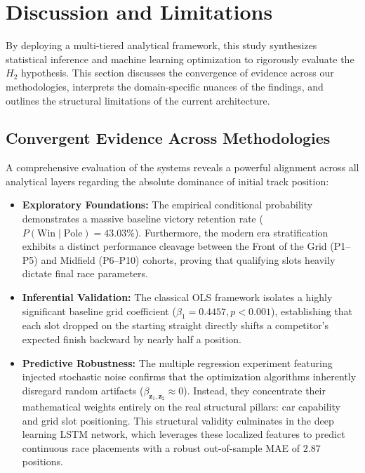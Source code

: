 \section{Discussion and Limitations}
\label{sec:discussion}

By deploying a multi-tiered analytical framework, this study synthesizes statistical inference and machine learning optimization to rigorously evaluate the $H_2$ hypothesis. This section discusses the convergence of evidence across our methodologies, interprets the domain-specific nuances of the findings, and outlines the structural limitations of the current architecture.

\subsection{Convergent Evidence Across Methodologies}
\label{subsec:convergent_evidence}

A comprehensive evaluation of the systems reveals a powerful alignment across all analytical layers regarding the absolute dominance of initial track position:
\begin{itemize}
    \item \textbf{Exploratory Foundations:} The empirical conditional probability demonstrates a massive baseline victory retention rate ($P(\text{Win} \mid \text{Pole}) = 43.03\%$). Furthermore, the modern era stratification exhibits a distinct performance cleavage between the Front of the Grid (P1--P5) and Midfield (P6--P10) cohorts, proving that qualifying slots heavily dictate final race parameters.
    \item \textbf{Inferential Validation:} The classical OLS framework isolates a highly significant baseline grid coefficient ($\beta_1 = 0.4457, p < 0.001$), establishing that each slot dropped on the starting straight directly shifts a competitor's expected finish backward by nearly half a position.
    \item \textbf{Predictive Robustness:} The multiple regression experiment featuring injected stochastic noise confirms that the optimization algorithms inherently disregard random artifacts ($\beta_{\mathbf{z}_1, \mathbf{z}_2} \approx 0$). Instead, they concentrate their mathematical weights entirely on the real structural pillars: car capability and grid slot positioning. This structural validity culminates in the deep learning LSTM network, which leverages these localized features to predict continuous race placements with a robust out-of-sample MAE of $2.87$ positions.
\end{itemize}

